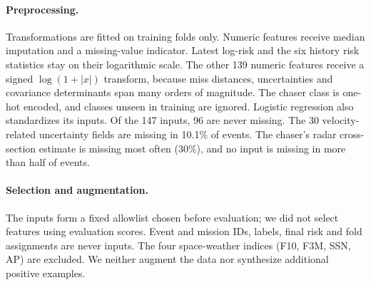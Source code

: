 \paragraph{Preprocessing.} Transformations are fitted on training folds only. Numeric features receive median imputation and a missing-value indicator. Latest log-risk and the six history risk statistics stay on their logarithmic scale. The other 139 numeric features receive a signed $\log(1+|x|)$ transform, because miss distances, uncertainties and covariance determinants span many orders of magnitude. The chaser class is one-hot encoded, and classes unseen in training are ignored. Logistic regression also standardizes its inputs. Of the 147 inputs, 96 are never missing. The 30 velocity-related uncertainty fields are missing in 10.1\% of events. The chaser's radar cross-section estimate is missing most often (30\%), and no input is missing in more than half of events.

\paragraph{Selection and augmentation.} The inputs form a fixed allowlist chosen before evaluation; we did not select features using evaluation scores. Event and mission IDs, labels, final risk and fold assignments are never inputs. The four space-weather indices (F10, F3M, SSN, AP) are excluded. %
We neither augment the data nor synthesize additional positive examples.
